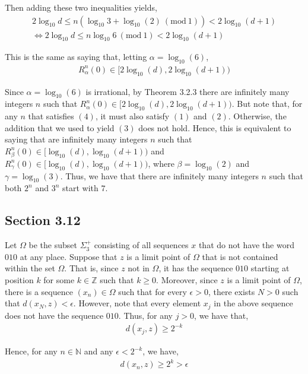 \documentclass[12pt]{article}
\newenvironment{problem}[2][Problem]{\begin{trivlist}
\item[\hskip \labelsep {\bfseries #1}\hskip \labelsep {\bfseries #2.}]}{\end{trivlist}}
\newcommand{\Mod}[1]{\ (\mathrm{mod}\ #1)}
\begin{document}
Then adding these two inequalities yields,
\begin{align}
2\log_{10} d \leq n (\log_{10} 3 + \log_{10}(2) \Mod{1}) < 2\log_{10}(d+1)\\
\iff 2\log_{10} d \leq n \log_{10} 6 \Mod{1} < 2\log_{10}(d+1)
\end{align}

This is the same as saying that, letting $\alpha = \log_{10}(6)$,
\begin{align*}
R_{\alpha}^n(0) \in [2\log_{10}(d), 2\log_{10}(d+1))
\end{align*}

Since $\alpha = \log_{10}(6)$ is irrational, by Theorem 3.2.3 there are infinitely many integers $n$ such that $R_{\alpha}^n(0) \in [2\log_{10}(d), 2\log_{10}(d+1))$. But note that, for any $n$ that satisfies $(4)$, it must also satisfy $(1)$ and $(2)$. Otherwise, the addition that we used to yield $(3)$ does not hold. Hence, this is equivalent to saying that are infinitely many integers $n$ such that $R_{\beta}^n(0) \in [\log_{10}(d), \log_{10}(d+1))$ and $R_{\gamma}^n(0) \in [\log_{10}(d), \log_{10}(d+1))$, where $\beta = \log_{10}(2)$ and $\gamma = \log_{10}(3)$. Thus, we have that there are infinitely many integers $n$ such that both $2^n$ and $3^n$ start with $7$.

\subsection{Section 3.12}

\begin{problem}{2}
\end{problem}

Let $\Omega$ be the subset $\Sigma^+_3$ consisting of all sequences $x$ that do not have the word $010$ at any place. Suppose that $z$ is a limit point of $\Omega$ that is not contained within the set $\Omega$. That is, since $z$ not in $\Omega$, it has the sequence $010$ starting at position $k$ for some $k \in \mathbb{Z}$ such that $k \geq 0$. Moreover, since $z$ is a limit point of $\Omega$, there is a sequence $(x_n) \in \Omega$ such that for every $\epsilon > 0$, there exists $N > 0$ such that $d(x_N, z) < \epsilon$. However, note that every element $x_j$ in the above sequence does not have the sequence $010$. Thus, for any $j > 0$, we have that,
\begin{align*}
d(x_j, z) \geq 2^{-k}
\end{align*}

Hence, for any $n \in \mathbb{N}$ and any $\epsilon < 2^{-k}$, we have,
\begin{align*}
d(x_n, z) \geq 2^k > \epsilon
\end{align*}
\end{document}
